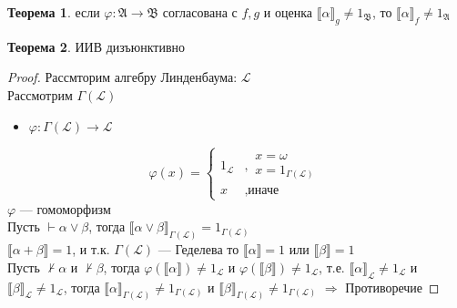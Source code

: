\documentclass[english]{article}
\newcommand{\A}{\mathfrak{A}}
\newcommand{\B}{\mathfrak{B}}
\theoremstyle{plain}
\theoremstyle{remark}
\theoremstyle{definition}
\newtheorem{theorem}{Теорема}[section]
\begin{document}
\begin{theorem}
если \(\varphi: \A \to \B\) согласована с \(f, g\) и оценка \(\llbracket \alpha \rrbracket_g \neq 1_\B\), то \(\llbracket \alpha \rrbracket_f \neq 1_\A\)
\end{theorem}
\begin{theorem}
ИИВ дизъюнктивно
\end{theorem}
\begin{proof}
Рассмторим алгебру Линденбаума: \(\mathcal{L}\) \\
Рассмотрим \(\Gamma(\mathcal{L})\) \\
\begin{itemize}
\item \(\varphi: \Gamma(\mathcal{L}) \to \mathcal{L}\)
\end{itemize}
\[ \varphi(x) = \begin{cases}1_\mathcal{L} & ,\substack{x =\omega \\ x = 1_{\Gamma(\mathcal{L})}} \\ x & , \text{иначе}\end{cases} \] 
\(\varphi\) --- гомоморфизм \\
Пусть \(\vdash \alpha \vee \beta\), тогда \(\llbracket \alpha \vee \beta \rrbracket_{\Gamma(\mathcal{L})} = 1_{\Gamma(\mathcal{L})}\) \\
\(\llbracket \alpha + \beta \rrbracket = 1\), и т.к. \(\Gamma(\mathcal{L})\) --- Геделева то \(\llbracket \alpha \rrbracket = 1\) или \(\llbracket \beta \rrbracket = 1\) \\
Пусть \(\not \vdash \alpha\) и \(\not \vdash \beta\), тогда \(\varphi(\llbracket \alpha \rrbracket) \neq 1_\mathcal{L}\) и \(\varphi(\llbracket \beta \rrbracket) \neq 1_\mathcal{L}\), т.е. \(\llbracket \alpha \rrbracket_\mathcal{L} \neq 1_\mathcal{L}\) и \(\llbracket \beta \rrbracket_\mathcal{L} \neq 1_\mathcal{L}\), тогда \(\llbracket \alpha \rrbracket_{\Gamma(\mathcal{L})} \neq 1_{\Gamma(\mathcal{L})}\) и \(\llbracket \beta \rrbracket_{\Gamma(\mathcal{L})} \neq 1_{\Gamma(\mathcal{L})}\) \(\Rightarrow\) Противоречие
\end{proof}
\end{document}
